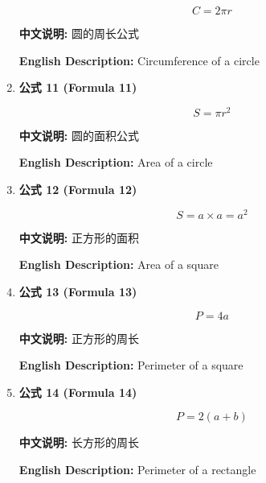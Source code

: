 \documentclass[12pt,a4paper]{article}
\begin{document}
\begin{enumerate}[leftmargin=*]
\begin{equation}
C = 2\pi r
\end{equation}

\textbf{中文说明:} 圆的周长公式

\textbf{English Description:} Circumference of a circle

\vspace{0.5cm}

\item \textbf{公式 11 (Formula 11)}

\begin{equation}
S = \pi r^2
\end{equation}

\textbf{中文说明:} 圆的面积公式

\textbf{English Description:} Area of a circle

\vspace{0.5cm}

\item \textbf{公式 12 (Formula 12)}

\begin{equation}
S = a \times a = a^2
\end{equation}

\textbf{中文说明:} 正方形的面积

\textbf{English Description:} Area of a square

\vspace{0.5cm}

\item \textbf{公式 13 (Formula 13)}

\begin{equation}
P = 4a
\end{equation}

\textbf{中文说明:} 正方形的周长

\textbf{English Description:} Perimeter of a square

\vspace{0.5cm}

\item \textbf{公式 14 (Formula 14)}

\begin{equation}
P = 2(a + b)
\end{equation}

\textbf{中文说明:} 长方形的周长

\textbf{English Description:} Perimeter of a rectangle

\vspace{0.5cm}


\end{enumerate}
\end{document}
